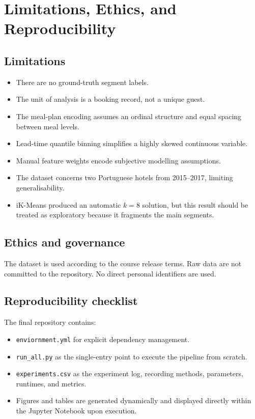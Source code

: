 \documentclass[11pt,a4paper]{article}
\begin{document}
\section{Limitations, Ethics, and Reproducibility}

\subsection{Limitations}
\begin{itemize}
    \item There are no ground-truth segment labels.
    \item The unit of analysis is a booking record, not a unique guest.
    \item The meal-plan encoding assumes an ordinal structure and equal spacing between meal levels.
    \item Lead-time quantile binning simplifies a highly skewed continuous variable.
    \item Manual feature weights encode subjective modelling assumptions.
    \item The dataset concerns two Portuguese hotels from 2015--2017, limiting generalisability.
    \item iK-Means produced an automatic $k=8$ solution, but this result should be treated as exploratory because it fragments the main segments.
\end{itemize}

\subsection{Ethics and governance}
The dataset is used according to the course release terms. Raw data are not committed to the repository. No direct personal identifiers are used.

\subsection{Reproducibility checklist}
The final repository contains:
\begin{itemize}
    \item \texttt{enviornment.yml} for explicit dependency management.
    \item \texttt{run\_all.py} as the single-entry point to execute the pipeline from scratch.
    \item \texttt{experiments.csv} as the experiment log, recording methods, parameters, runtimes, and metrics.
    \item Figures and tables are generated dynamically and displayed directly within the Jupyter Notebook upon execution.
\end{itemize}
\end{document}
